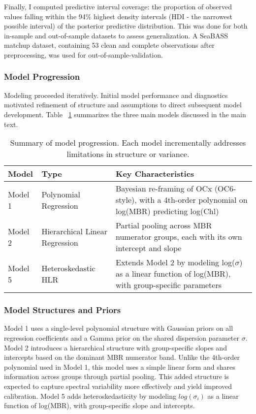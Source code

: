 \documentclass[preprint,authoryear]{elsarticle}
\begin{document}
Finally, I computed predictive interval coverage: the proportion of observed values falling within the 94\% highest density intervals (HDI - the narrowest possible interval)  of the posterior predictive distribution. This was done for both in-sample  and out-of-sample datasets to assess generalization. A SeaBASS matchup dataset, containing 53 clean and complete observations after preprocessing, was used for out-of-sample-validation.


\subsubsection{Model Progression}

Modeling proceeded iteratively. Initial model performance and diagnostics motivated refinement of structure and assumptions to direct subsequent model development. Table ~\ref{tab:model-overview} summarizes the three main models discussed in the main text.

\begin{table}[H]
\centering
\caption{Summary of model progression. Each model incrementally addresses limitations in structure or variance.}
\label{tab:model-overview}
\begin{tabular}{llp{7.5cm}}
\toprule
\textbf{Model} & \textbf{Type} & \textbf{Key Characteristics} \\
\midrule
Model 1 & Polynomial Regression & Bayesian re-framing of OCx (OC6-style), with a 4th-order polynomial on log(MBR) predicting log(Chl) \\
Model 2 & Hierarchical Linear Regression & Partial pooling across MBR numerator groups, each with its own intercept and slope \\
Model 5 & Heteroskedastic HLR & Extends Model 2 by modeling log($\sigma$) as a linear function of log(MBR), with group-specific parameters \\
\bottomrule
\end{tabular}
\end{table}

\subsubsection{Model Structures and Priors}

Model 1 uses a single-level polynomial structure with Gaussian priors on all regression coefficients and a Gamma prior on the shared dispersion parameter $\sigma$. Model 2 introduces a hierarchical structure with group-specific slopes and intercepts based on the dominant MBR numerator band. Unlike the 4th-order polynomial used in Model 1, this model uses a simple linear form and shares information across groups through partial pooling. This added structure is expected to capture spectral variability more effectively and yield improved calibration. Model 5 adds heteroskedasticity by modeling $log(\sigma_i)$ as a linear function of log(MBR), with group-specific slope and intercepts.
\end{document}

